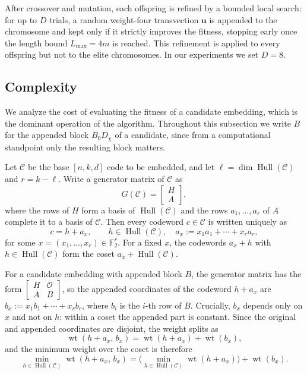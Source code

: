 \documentclass{article}
\newcommand{\Hull}{\operatorname{Hull}}
\begin{document}
After crossover and mutation, each offspring is refined by a bounded local search: for up to $D$ trials, a random weight-four transvection $\mathbf{u}$ is appended to the chromosome and kept only if it strictly improves the fitness, stopping early once the length bound $L_{\max}=4m$ is reached. This refinement is applied to every offspring but not to the elite chromosomes. In our experiments we set $D=8$.
\subsection{Complexity}\label{sec:complexity}
We analyze the cost of evaluating the fitness of a candidate embedding, which is the dominant operation of the algorithm. Throughout this subsection we write $B$ for the appended block $B_0D_{\chi}$ of a candidate, since from a computational standpoint only the resulting block matters.

Let $\mathcal{C}$ be the base $[n,k,d]$ code to be embedded, and let $\ell=\dim\Hull(\mathcal{C})$ and $r=k-\ell$. Write a generator matrix of $\mathcal{C}$ as
\[
G(\mathcal{C})=\begin{bmatrix} H \\ A \end{bmatrix},
\]
where the rows of $H$ form a basis of $\Hull(\mathcal{C})$ and the rows $a_1,\ldots,a_r$ of $A$ complete it to a basis of $\mathcal{C}$. Then every codeword $c\in\mathcal{C}$ is written uniquely as
\[
c=h+a_x,\qquad h\in\Hull(\mathcal{C}),\quad a_x:=x_1a_1+\cdots+x_ra_r,
\]
for some $x=(x_1,\ldots,x_r)\in\mathbb{F}_2^r$. For a fixed $x$, the codewords $a_x+h$ with $h\in\Hull(\mathcal{C})$ form the coset $a_x+\Hull(\mathcal{C})$.

For a candidate embedding with appended block $B$, the generator matrix has the form $\begin{bmatrix} H & \mathcal{O} \\ A & B \end{bmatrix}$, so the appended coordinates of the codeword $h+a_x$ are $b_x:=x_1b_1+\cdots+x_rb_r$, where $b_i$ is the $i$-th row of $B$. Crucially, $b_x$ depends only on $x$ and not on $h$: within a coset the appended part is constant. Since the original and appended coordinates are disjoint, the weight splits as
\[
\operatorname{wt}(h+a_x,\,b_x)=\operatorname{wt}(h+a_x)+\operatorname{wt}(b_x),
\]
and the minimum weight over the coset is therefore
\[
\min_{h\in\Hull(\mathcal{C})}\operatorname{wt}(h+a_x,\,b_x)
=\Big(\min_{h\in\Hull(\mathcal{C})}\operatorname{wt}(h+a_x)\Big)+\operatorname{wt}(b_x).
\]
\end{document}
